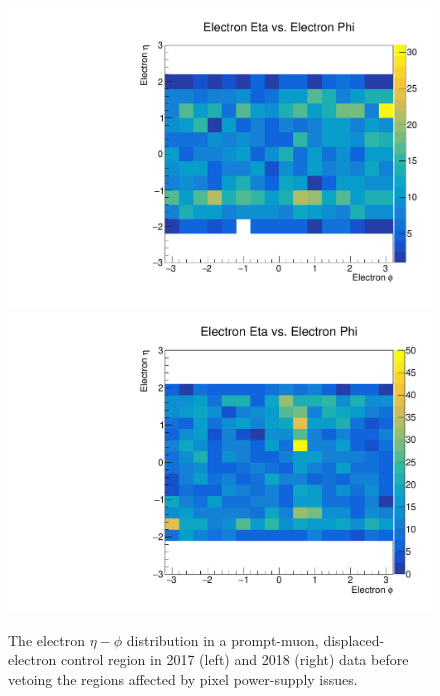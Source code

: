 \begin{figure}
\centering
\includegraphics[scale=0.3]{figures/selection/displacedE_etaPhi_data_2017.pdf}
\includegraphics[scale=0.3]{figures/selection/displacedE_etaPhi_data_2018.pdf}
\caption{The electron $\eta-\phi$ distribution in a prompt-muon, displaced-electron control region in 2017 (left) and 2018 (right) data before vetoing the regions affected by pixel power-supply issues.}
\label{eta_phi_vetos}
\end{figure}
